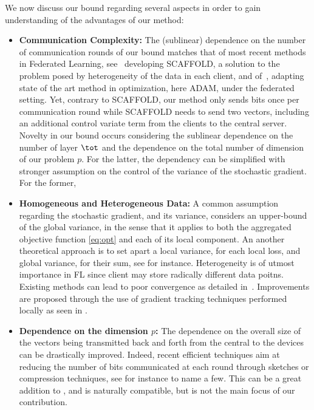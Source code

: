 \documentclass{article}
\begin{document}
We now discuss our bound regarding several aspects in order to gain understanding of the advantages of our method:
\begin{itemize}
\item \textbf{Communication Complexity:} The (sublinear) dependence on the number of communication rounds of our bound matches that of most recent methods in Federated Learning, see~\citet{karimireddy2019scaffold} developing SCAFFOLD, a solution to the problem posed by heterogeneity of the data in each client, and of~\citet{reddi2020adaptive}, adapting state of the art method in optimization, here ADAM, under the federated setting. 
Yet, contrary to SCAFFOLD, our method only sends bits once per communication round while SCAFFOLD needs to send two vectors, including an additional control variate term  from the clients to the central server.
Novelty in our bound occurs considering the sublinear dependence on the number of layer $\tot$ and the dependence on the total number of dimension of our problem $p$. For the latter, the dependency can be simplified with stronger assumption on the control of the variance of the stochastic gradient. For the former, 


\item \textbf{Homogeneous and Heterogeneous Data:} A common assumption regarding the stochastic gradient, and its variance, considers an upper-bound of the global variance, in the sense that it applies to both the aggregated objective function \eqref{eq:opt} and each of its local component. 
An another theoretical approach is to set apart a local variance, for each local loss, and global variance, for their sum, see \citet{chen2020toward} for instance.
Heterogeneity is of utmost importance in FL since client may store radically different data poitns.
Existing methods can lead to poor convergence as detailed in~\citep{li2019federated,liang2019variance}. 
Improvements are proposed through the use of gradient tracking techniques performed locally as seen in \citep{haddadpour2020federated,horvath2019stochastic,karimireddy2019scaffold}.


\item \textbf{Dependence on the dimension $p$:} The dependence on the overall size of the vectors being transmitted back and forth from the central to the devices can be drastically improved. Indeed, recent efficient techniques aim at reducing the number of bits communicated at each round through sketches or compression techniques, see for instance \citep{haddadpour2020fedsketch,ivkin2019communication,li2019privacy} to name a few.
This can be a great addition to \algo, and is naturally compatible, but is not the main focus of our contribution.

\end{itemize} 
\end{document}
